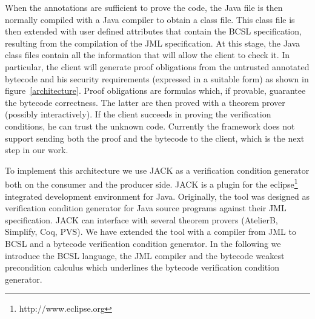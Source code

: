 When the annotations are sufficient to prove the code, 
the Java file is then normally compiled with a Java compiler to obtain a 
class file. This class file is then extended with user defined attributes that contain the BCSL specification, resulting from the compilation of the JML specification. 
At this stage, the Java class files contain all the information that will allow the client to check it. 
In particular, the client will generate proof obligations from the untrusted annotated bytecode and his security requirements 
(expressed in a suitable form) as shown in figure~\ref{architecture}. Proof obligations are formulas which, if provable, guarantee the bytecode correctness.
The latter are then proved with a theorem prover (possibly interactively). If the client succeeds in proving 
the verification conditions, he can trust the unknown code. Currently the framework does not support sending both the proof and the 
bytecode to the client, which is the next step in our work.


To implement this architecture we use JACK as a verification condition generator both on the consumer and the
producer side. JACK is a plugin for the eclipse\footnote{http://www.eclipse.org} integrated development environment for Java. Originally, the tool was designed as verification condition generator for Java source programs against their JML specification. JACK can interface with several theorem provers (AtelierB, Simplify, Coq, PVS). We have extended the tool with a compiler from JML to BCSL and a bytecode verification condition generator. In the following we introduce the BCSL language, the JML compiler and the bytecode weakest precondition calculus which underlines the bytecode verification condition generator.
 
